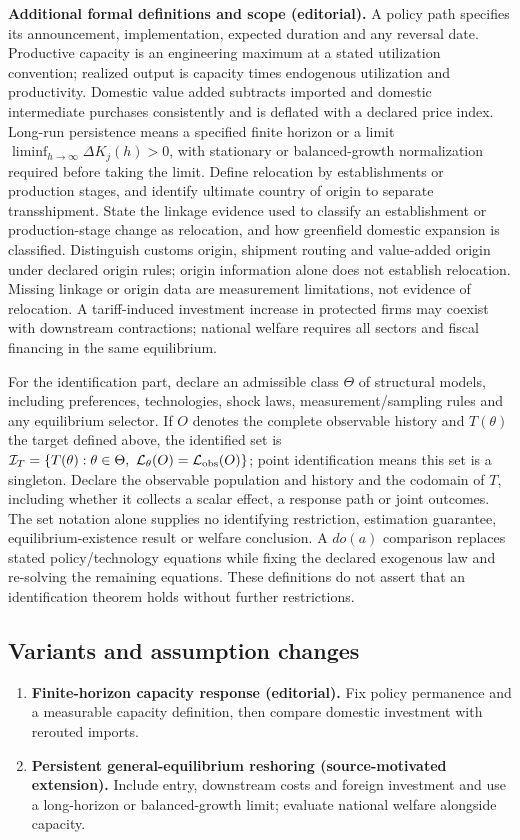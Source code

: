 \documentclass[11pt,a4paper]{article}
\begin{document}
\textbf{Additional formal definitions and scope (editorial).} A policy path specifies its announcement, implementation, expected duration and any reversal date. Productive capacity is an engineering maximum at a stated utilization convention; realized output is capacity times endogenous utilization and productivity. Domestic value added subtracts imported and domestic intermediate purchases consistently and is deflated with a declared price index. Long-run persistence means a specified finite horizon or a limit \(\liminf_{h\to\infty}\Delta K_j(h)>0\), with stationary or balanced-growth normalization required before taking the limit. Define relocation by establishments or production stages, and identify ultimate country of origin to separate transshipment. State the linkage evidence used to classify an establishment or production-stage change as relocation, and how greenfield domestic expansion is classified. Distinguish customs origin, shipment routing and value-added origin under declared origin rules; origin information alone does not establish relocation. Missing linkage or origin data are measurement limitations, not evidence of relocation. A tariff-induced investment increase in protected firms may coexist with downstream contractions; national welfare requires all sectors and fiscal financing in the same equilibrium.

For the identification part, declare an admissible class \(\Theta\) of structural models, including preferences, technologies, shock laws, measurement/sampling rules and any equilibrium selector. If \(O\) denotes the complete observable history and \(T(\theta)\) the target defined above, the identified set is \(\mathcal I_T=\{T(\theta):\theta\in\Theta,\ \mathcal L_\theta(O)=\mathcal L_{\rm obs}(O)\}\); point identification means this set is a singleton. Declare the observable population and history and the codomain of \(T\), including whether it collects a scalar effect, a response path or joint outcomes. The set notation alone supplies no identifying restriction, estimation guarantee, equilibrium-existence result or welfare conclusion. A \(do(a)\) comparison replaces stated policy/technology equations while fixing the declared exogenous law and re-solving the remaining equations. These definitions do not assert that an identification theorem holds without further restrictions.
\subsection*{Variants and assumption changes}
\begin{enumerate}
\item \textbf{Finite-horizon capacity response (editorial).} Fix policy permanence and a measurable capacity definition, then compare domestic investment with rerouted imports.
\item \textbf{Persistent general-equilibrium reshoring (source-motivated extension).} Include entry, downstream costs and foreign investment and use a long-horizon or balanced-growth limit; evaluate national welfare alongside capacity.
\end{enumerate}
\end{document}
